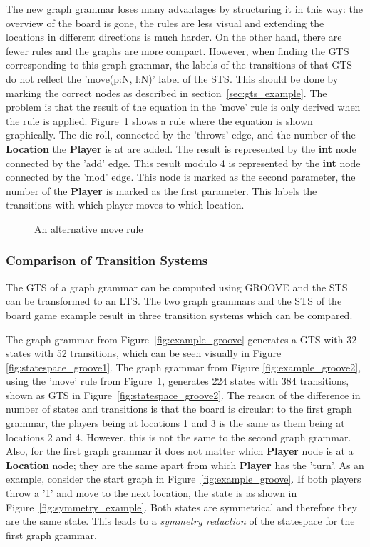 The new graph grammar loses many advantages by structuring it in this way: the overview of the board is gone, the rules are less visual and extending the locations in different directions is much harder. On the other hand, there are fewer rules and the graphs are more compact. However, when finding the GTS corresponding to this graph grammar, the labels of the transitions of that GTS do not reflect the 'move(p:N, l:N)' label of the STS. This should be done by marking the correct nodes as described in section~\ref{sec:gts_example}. The problem is that the result of the equation in the 'move' rule is only derived when the rule is applied. Figure~\ref{fig:move3} shows a rule where the equation is shown graphically. The die roll, connected by the 'throws' edge, and the number of the \textbf{Location} the \textbf{Player} is at are added. The result is represented by the \textbf{int} node connected by the 'add' edge. This result modulo 4 is represented by the \textbf{int} node connected by the 'mod' edge. This node is marked as the second parameter, the number of the \textbf{Player} is marked as the first parameter. This labels the transitions with which player moves to which location.

\begin{figure}[ht]
  \begin{center}
    
  \end{center}
  \caption{An alternative move rule}
  \label{fig:move3}
\end{figure}

\subsubsection{Comparison of Transition Systems}
The GTS of a graph grammar can be computed using GROOVE and the STS can be transformed to an LTS. The two graph grammars and the STS of the board game example result in three transition systems which can be compared.

The graph grammar from Figure~\ref{fig:example_groove} generates a GTS with 32 states with 52 transitions, which can be seen visually in Figure~ \ref{fig:statespace_groove1}. The graph grammar from Figure \ref{fig:example_groove2}, using the 'move' rule from Figure~\ref{fig:move3}, generates 224 states with 384 transitions, shown as GTS in Figure~\ref{fig:statespace_groove2}. The reason of the difference in number of states and transitions is that the board is circular: to the first graph grammar, the players being at locations 1 and 3 is the same as them being at locations 2 and 4. However, this is not the same to the second graph grammar. Also, for the first graph grammar it does not matter which \textbf{Player} node is at a \textbf{Location} node; they are the same apart from which \textbf{Player} has the 'turn'. As an example, consider the start graph in Figure~\ref{fig:example_groove}. If both players throw a '1' and move to the next location, the state is as shown in Figure~\ref{fig:symmetry_example}. Both states are symmetrical and therefore they are the same state. This leads to a \textit{symmetry reduction} of the statespace for the first graph grammar.


